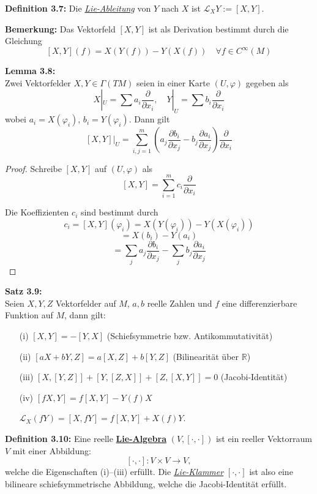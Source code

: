\documentclass[fleqn, 12pt, letterpaper]{article}
\newcommand{\deldel}[2]{\frac{\partial #1}{\partial #2}}
\begin{document}
\medskip

\textbf{Definition 3.7:}
Die \emph{\underline{Lie-Ableitung}} von \( Y \) nach \( X \) ist \( \mathcal{L}_X Y := [X, Y] \).\\

\medskip

\textbf{Bemerkung:}
Das Vektorfeld \([X,Y]\) ist als Derivation bestimmt durch die Gleichung
\[
[X, Y](f) = X(Y(f)) - Y(X(f)) \quad \forall f \in C^\infty(M)
\]

\textbf{Lemma 3.8:} \\

Zwei Vektorfelder \( X, Y \in \Gamma(TM) \) seien in einer Karte \( (U, \varphi) \) gegeben als
\[
X|_U = \sum a_i \frac{\partial}{\partial x_i}, \quad
Y|_U = \sum b_i \frac{\partial}{\partial x_i}
\]
wobei $a_i=X(\varphi_i)$, $b_i=Y(\varphi_i)$. Dann gilt
\[
[X, Y]|_U = \sum_{i,j=1}^m \left( a_j\deldel{b_i}{x_j}-b_j\deldel{a_i}{x_j} \right) \frac{\partial}{\partial x_i}
\]
\begin{proof}
    Schreibe \( [X, Y] \) auf \( (U, \varphi) \) als 
\[
[X, Y] = \sum_{i=1}^{m} c_i \frac{\partial}{\partial x_i}
\]

Die Koeffizienten \( c_i \) sind bestimmt durch
\[
c_i = [X, Y](\varphi_i)
= X\left( Y(\varphi_i) \right)
- Y\left( X(\varphi_i) \right)
\]
\[
= X(b_i) - Y(a_i)
\]
\[
= \sum_j a_j \frac{\partial b_i}{\partial x_j}
- \sum_j b_j \frac{\partial a_i}{\partial x_j}
\]
\end{proof}

\textbf{Satz 3.9:} \\
Seien \( X, Y, Z \) Vektorfelder auf \( M \), \( a, b \) reelle Zahlen und \( f \) eine differenzierbare Funktion auf \( M \), dann gilt:

\begin{itemize}
  \item[(i)] \( [X, Y] = -[Y, X] \) \hfill (Schiefsymmetrie bzw. Antikommutativität)
  \item[(ii)] \( [aX + bY, Z] = a[X, Z] + b[Y, Z] \) \hfill (Bilinearität über \( \mathbb{R} \))
  \item[(iii)] \( [X, [Y, Z]] + [Y, [Z, X]] + [Z, [X, Y]] = 0 \) \hfill (Jacobi-Identität)
  \item[(iv)] \( [fX, Y] = f[X, Y] - Y(f)X \)
  
  \( \mathcal{L}_X(fY) = [X, fY] = f[X, Y] + X(f)Y \).
\end{itemize}

\medskip

\textbf{Definition 3.10:}
Eine reelle \underline{\textbf{Lie-Algebra}} $(V, [\cdot,\cdot])$ ist ein reeller Vektorraum \( V \) mit einer Abbildung:
\[
[ \cdot , \cdot ] \colon V \times V \longrightarrow V,
\]
welche die Eigenschaften (i)--(iii) erfüllt. Die \emph{\underline{Lie-Klammer}} \( [ \cdot , \cdot ] \) ist also eine bilineare schiefsymmetrische Abbildung, welche die Jacobi-Identität erfüllt.\\
\end{document}
